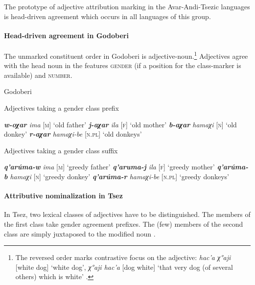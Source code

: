 The prototype of adjective attribution marking in the Avar-Andi-Tsezic languages is head-driven agreement which occurs in all languages of this group.

\paragraph{Head-driven agreement in Godoberi}
The unmarked constituent order in Godoberi is adjective-noun.\footnote{The reversed order marks contrastive focus on the adjective: \textit{hac'a χ°aji} [white dog] ‘white dog’, \textit{χ°aji hac'a} [dog white] ‘that very dog (of several others) which is white’ \citep[149]{kazenin1996a}.} Adjectives agree with the head noun in the features \textsc{gender} (if a position for the class-marker is available) and \textsc{number}.
\begin{exe}
\ex 
\rm{Godoberi \citep[25]{tatevosov1996a}}
\begin{xlist}
\ex 
\rm{Adjectives taking a gender class prefix}
\begin{xlist}
\ex	\textit{\textbf{w-oχar} ima} 			\rm{[\textsc{m}] ‘old father’}
\ex	\textit{\textbf{j-aχar} ila} 			\rm{[\textsc{f}] ‘old mother’}
\ex	\textit{\textbf{b-aχar} hamaχi} 		\rm{[\textsc{n}] ‘old donkey’}
\ex	\textit{\textbf{r-aχar} hamaχi-be} 	\rm{[\textsc{n.pl}] ‘old donkeys’}
\end{xlist}

\ex 
\rm{Adjectives taking a gender class suffix}
\begin{xlist}
\ex	\textit{\textbf{q'arúma-w} ima} 		\rm{[\textsc{m}] ‘greedy father’}
\ex	\textit{\textbf{q'aruma-j} ila} 		\rm{[\textsc{f}] ‘greedy mother’}
\ex	\textit{\textbf{q'arúma-b} hamaχi} 	\rm{[\textsc{n}] ‘greedy donkey’}
\ex	\textit{\textbf{q'arúma-r} hamaχi-be} 	\rm{[\textsc{n.pl}] ‘greedy donkeys’}
\end{xlist}
\end{xlist}
\end{exe}

\paragraph{Attributive nominalization in Tsez}
In Tsez, two lexical classes of adjectives have to be distinguished. The members of the first class take gender agreement prefixes. The (few) members of the second class are simply juxtaposed to the modified noun \cite[126]{alekseev-etal2004}.

